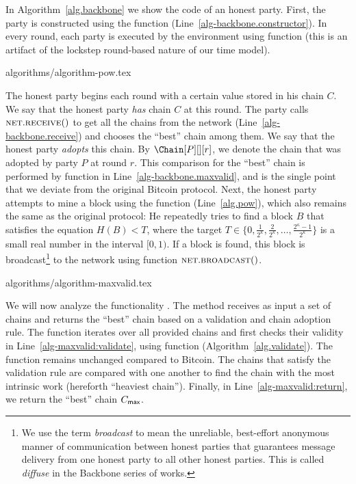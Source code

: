 In Algorithm~\ref{alg.backbone} we show the code of an honest party.
First, the party is constructed using the \constructor function (Line~\ref{alg-backbone.constructor}).
In every round, each party is executed by the environment using function \execute
(this is an artifact of the lockstep round-based nature of
our time model).

{algorithms/algorithm-pow.tex}

The honest party begins each round with a certain value stored in his chain $C$.
We say that the honest party \emph{has} chain $C$ at this round. The party calls $\textsc{net}.\textsc{re}\-\textsc{ceive}()$ to get all
the chains from the network (Line~\ref{alg-backbone.receive}) and chooses the
``best'' chain among them. We say that the honest party
\emph{adopts} this chain. By $\Chain[P][][r]$, we denote the chain that was adopted
by party $P$ at round $r$.
This comparison for the ``best'' chain is performed by
function \maxvalid in Line~\ref{alg-backbone.maxvalid}, and
is the single point that we deviate from the original Bitcoin protocol.
Next, the honest party attempts to mine a block using the \pow function (Line~\ref{alg.pow}),
which also remains the same as the original protocol: He repeatedly tries to find a block $B$
that satisfies the \pow equation $H(B) < T$, where the target
$T \in \{0, \frac{1}{2^\kappa}, \frac{2}{2^\kappa}, \ldots, \frac{2^\kappa - 1}{2^\kappa}\}$ is a small real number in
the interval $[0, 1)$.
If a block is found, this block is broadcast\footnote{We use the term \emph{broadcast}
to mean the unreliable, best-effort anonymous manner of communication between honest parties that
guarantees message delivery from one honest party to all other honest parties.
This is called \emph{diffuse} in the Backbone series of works.}
to the network using function $\textsc{net}.\textsc{broadcast}()$.

{algorithms/algorithm-maxvalid.tex}

We will now analyze the functionality \maxvalid. The method receives as input
a set of chains and returns the ``best'' chain based on a validation and
chain adoption rule. The function iterates over all provided chains
and first checks their validity in Line~\ref{alg-maxvalid:validate}, using
function \validate (Algorithm~\ref{alg.validate}). The \validate function remains unchanged compared to
Bitcoin.
The chains that satisfy the validation rule
are compared with one another to find the chain
with the most intrinsic work (hereforth ``heaviest chain'').
Finally, in Line~\ref{alg-maxvalid:return}, we return the
``best'' chain $C_{\textsf{max}}$.

